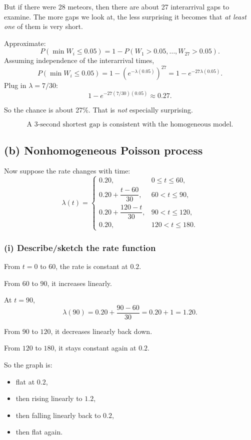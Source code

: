 \documentclass[11pt]{article}
\begin{document}
But if there were 28 meteors, then there are about 27 interarrival gaps to examine.
The more gaps we look at, the less surprising it becomes that \emph{at least one} of them is very short.

Approximate:
\[
P(\min W_i\le 0.05)
=
1-P(W_1>0.05,\dots,W_{27}>0.05).
\]
Assuming independence of the interarrival times,
\[
P(\min W_i\le 0.05)
=
1-\left(e^{-\lambda(0.05)}\right)^{27}
=
1-e^{-27\lambda(0.05)}.
\]
Plug in $\lambda=7/30$:
\[
1-e^{-27(7/30)(0.05)}
\approx 0.27.
\]

So the chance is about 27\%.
That is \emph{not} especially surprising.

\[
\boxed{\text{A 3-second shortest gap is consistent with the homogeneous model.}}
\]

\subsection*{(b) Nonhomogeneous Poisson process}

Now suppose the rate changes with time:
\[
\lambda(t)=
\begin{cases}
0.20, & 0\le t\le 60,\\[0.3em]
0.20+\dfrac{t-60}{30}, & 60<t\le 90,\\[0.8em]
0.20+\dfrac{120-t}{30}, & 90<t\le 120,\\[0.8em]
0.20, & 120<t\le 180.
\end{cases}
\]

\subsubsection*{(i) Describe/sketch the rate function}

From $t=0$ to $60$, the rate is constant at $0.2$.

From $60$ to $90$, it increases linearly.

At $t=90$,
\[
\lambda(90)=0.20+\frac{90-60}{30}=0.20+1=1.20.
\]

From $90$ to $120$, it decreases linearly back down.

From $120$ to $180$, it stays constant again at $0.2$.

So the graph is:
\begin{itemize}[leftmargin=1.5em]
    \item flat at $0.2$,
    \item then rising linearly to $1.2$,
    \item then falling linearly back to $0.2$,
    \item then flat again.
\end{itemize}
\end{document}

